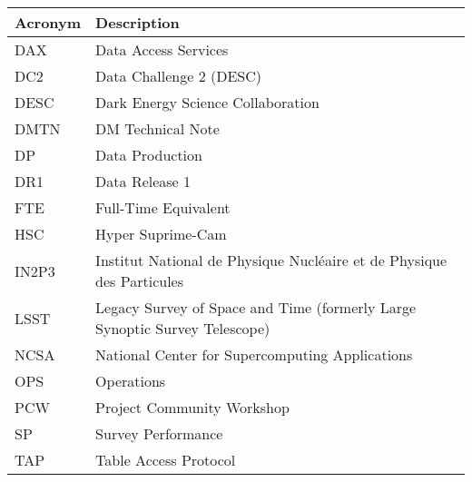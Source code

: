 \addtocounter{table}{-1}
\begin{longtable}{p{}p{}}\hline
\textbf{Acronym} & \textbf{Description}  \\\hline

DAX & Data Access Services \\\hline
DC2 & Data Challenge 2 (DESC) \\\hline
DESC & Dark Energy Science Collaboration \\\hline
DMTN & DM Technical Note \\\hline
DP & Data Production \\\hline
DR1 & Data Release 1 \\\hline
FTE & Full-Time Equivalent \\\hline
HSC & Hyper Suprime-Cam \\\hline
IN2P3 & Institut National de Physique Nucléaire et de Physique des Particules \\\hline
LSST & Legacy Survey of Space and Time (formerly Large Synoptic Survey Telescope) \\\hline
NCSA & National Center for Supercomputing Applications \\\hline
OPS & Operations \\\hline
PCW & Project Community Workshop \\\hline
SP & Survey Performance \\\hline
TAP & Table Access Protocol \\\hline
\end{longtable}

